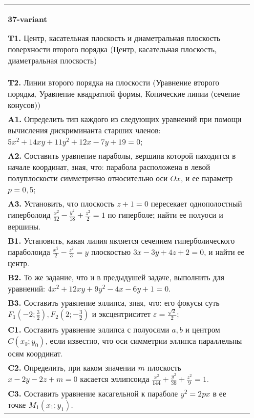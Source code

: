 \documentclass{article}
\begin{document}
\begin{tabular}{m{17cm}}
\textbf{37-variant}
\newline

\textbf{T1.} Центр, касательная плоскость и диаметральная плоскость поверхности второго порядка (Центр, касательная плоскость, диаметральная плоскость) \\
\textbf{T2.} Линии второго порядка на плоскости (Уравнение второго порядка, Уравнение квадратной формы, Конические линии (сечение конусов)) \\
\textbf{A1.} Определить тип каждого из следующих уравнений при помощи вычисления дискриминанта старших членов: $5 x^2+14 x y+11 y^2+12 x-7 y+19=0$; \\
\textbf{A2.} Составить уравнение параболы, вершина которой находится в начале координат, зная, что: парабола расположена в левой полуплоскости симметрично относительно оси $O x$, и ее параметр $p=0,5$; \\
\textbf{A3.} Установить, что плоскость $z+1=0$ пересекает однополостный гиперболоид $\frac{x^2}{32}-\frac{y^2}{18}+\frac{z^2}{2}=1$ по гиперболе; найти ее полуоси и вершины. \\
\textbf{B1.} Установить, какая линия является сечением гиперболического параболоида $\frac{x^2}{2}-\frac{z^2}{3}=y$ плоскостью $3 x-3 y+4 z+2=0$, и найти ее центр. \\
\textbf{B2.} То же задание, что и в предыдушей задаче, выполнить для уравнений: $4 x^2+12 x y+9 y^2-4 x-6 y+1=0$. \\
\textbf{B3.} Составить уравнение эллипса, зная, что: его фокусы суть $F_1\left(-2 ; \frac{3}{2}\right), F_2\left(2 ;-\frac{3}{2}\right)$ и эксцентриситет $\varepsilon=\frac{\sqrt{2}}{2}$; \\
\textbf{C1.} Составить уравнение эллипса с полуосями $a, b$ и центром $C\left(x_0 ; y_0\right)$, если известно, что оси симметрии эллипса параллельны осям координат. \\
\textbf{C2.} Определить, при каком значении $m$ плоскость $x-2 y-2 z+m=0$ касается эллипсоида $\frac{x^2}{144}+\frac{y^2}{36}+\frac{z^2}{9}=1$. \\
\textbf{C3.} Составить уравнение касагельной к параболе $y^2=2 p x$ в ее точке $M_1\left(x_1 ; y_1\right)$. \\

\end{tabular}
\vspace{1cm}
\end{document}
